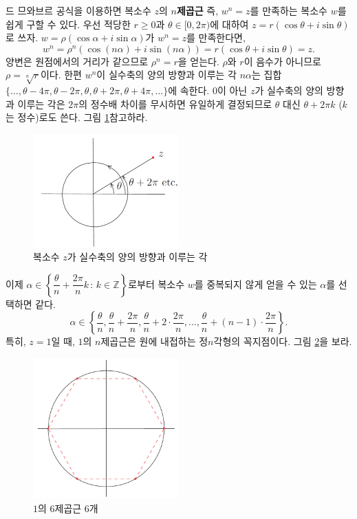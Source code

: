 드 므와브르 공식을 이용하면
복소수  $z$의 $n$\textbf{제곱근}
즉, $w^n=z$를 만족하는 복소수 $w$를 쉽게 구할 수 있다.
우선 적당한 $r\ge0$과 $\theta\in[0,2\pi)$에 대하여 $z=r(\cos\theta + i \sin\theta)$로 쓰자.
$w= \rho(\cos\alpha + i\sin\alpha)$가 $w^n=z$를 만족한다면,
$$
w^n = \rho^n\left( \cos(n\alpha) + i\sin(n\alpha)\right) = r(\cos\theta + i\sin\theta)= z.
$$
양변은 원점에서의 거리가 같으므로 $\rho^n=r$을 얻는다.
$\rho$와 $r$이 음수가 아니므로 $\rho = \sqrt[n]{r}$이다.
한편 $w^n$이 실수축의 양의 방향과 이루는 각 $n\alpha$는 
집합 $ \{ \ldots, \theta - 4\pi, \theta - 2\pi, \theta, \theta+2\pi, \theta+4\pi, \ldots\} $에 속한다.
$0$이 아닌 $z$가 실수축의 양의 방향과 이루는 각은 $2\pi$의 정수배 차이를 무시하면 유일하게 결정되므로
$\theta$ 대신 $\theta + 2\pi k$ ($k$는 정수)로도 쓴다. 그림 \ref{fig-1-7}\을 참고하라.

\begin{figure}[!h]
\begin{center}
\includegraphics[width=0.5\textwidth]{./SaltChapter/figs/fig-1-7}
\end{center}
\caption{복소수 $z$가 실수축의 양의 방향과 이루는 각}
\label{fig-1-7}
\end{figure}

이제 $\alpha \in \left\{ \dfrac{\theta}{n}+ \dfrac{2\pi}{n}k \,:\, k\in\mathbb Z \right\}$로부터
복소수 $w$를 중복되지 않게 얻을 수 있는 $\alpha$를 선택하면 같다.
$$
\alpha \in \left\{
\dfrac\theta n,  \dfrac\theta n+ \dfrac{2\pi}n, \dfrac\theta n + 2\cdot \dfrac{2\pi}n, \ldots,
\dfrac\theta n+ (n-1)\cdot \dfrac{2\pi}n
\right\}.
$$
특히, $z=1$일 때, $1$의 $n$제곱근은 원에 내접하는 정$n$각형의 꼭지점이다.
그림 \ref{fig-1-8}을 보라.
\begin{figure}[!h]
\begin{center}
\includegraphics[width=0.5\textwidth]{./SaltChapter/figs/fig-1-8}
\end{center}
\caption{$1$의 $6$제곱근 $6$개}
\label{fig-1-8}
\end{figure}

